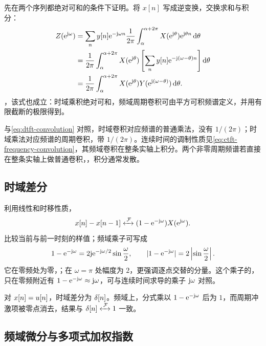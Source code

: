 先在两个序列都绝对可和的条件下证明。将 $x[n]$ 写成逆变换，交换求和与积分：
\begin{align*}
  Z(\mathrm{e}^{\mathrm{j}\omega})
    &=\sum_n y[n]\mathrm{e}^{-\mathrm{j}\omega n}
        \frac1{2\pi}\int_{\alpha}^{\alpha+2\pi}
          X(\mathrm{e}^{\mathrm{j}\theta})\mathrm{e}^{\mathrm{j}\theta n}\mathop{}\!\mathrm{d}\theta\\
    &=\frac1{2\pi}\int_{\alpha}^{\alpha+2\pi}
        X(\mathrm{e}^{\mathrm{j}\theta})
        \left[\sum_n y[n]\mathrm{e}^{-\mathrm{j}(\omega-\theta)n}\right]\mathop{}\!\mathrm{d}\theta\\
    &=\frac1{2\pi}\int_{\alpha}^{\alpha+2\pi}
        X(\mathrm{e}^{\mathrm{j}\theta})Y(\mathrm{e}^{\mathrm{j}(\omega-\theta)})\mathop{}\!\mathrm{d}\theta.
\end{align*}
，该式也成立：时域乘积绝对可和，频域周期卷积可由平方可积频谱定义，并用有限截断的极限得到。

与\cref{eq:dtft-convolution} 对照，时域卷积对应频谱的普通乘法，没有 $1/(2\pi)$；时域乘法对应频谱的周期卷积，带 $1/(2\pi)$。连续时间的调制性质见\cref{eq:ctft-frequency-convolution}，其频域卷积在整条实轴上积分。两个非零周期频谱若直接在整条实轴上做普通卷积，，积分通常发散。

\subsection{时域差分}
\label{sec:dtft-difference}

利用线性和时移性质，
\begin{equation}
  x[n]-x[n-1]\mathrel{\xleftrightarrow{\,\mathcal{F}\,}}
  (1-\mathrm{e}^{-\mathrm{j}\omega})X(\mathrm{e}^{\mathrm{j}\omega}).
  \label{eq:dtft-difference}
\end{equation}
比较当前与前一时刻的样值；频域乘子可写成
\[
  1-\mathrm{e}^{-\mathrm{j}\omega}
  =2\mathrm{j}\mathrm{e}^{-\mathrm{j}\omega/2}\sin\frac{\omega}{2},
  \qquad |1-\mathrm{e}^{-\mathrm{j}\omega}|=2\left|\sin\frac{\omega}{2}\right|.
\]
它在零频处为零，；在 $\omega=\pi$ 处幅度为 $2$，更强调逐点交替的分量。这个乘子的，只在零频附近有 $1-\mathrm{e}^{-\mathrm{j}\omega}\approx\mathrm{j}\omega$，可与连续时间求导的乘子 $\mathrm{j}\omega$ 对照。

对 $x[n]=u[n]$，时域差分为 $\delta[n]$。频域上，分式乘以 $1-\mathrm{e}^{-\mathrm{j}\omega}$ 后为 $1$，而周期冲激项被零点消去，结果与 $\delta[n]\mathrel{\xleftrightarrow{\,\mathcal{F}\,}}1$ 一致。

\subsection{频域微分与多项式加权指数}
\label{sec:dtft-frequency-derivative}

